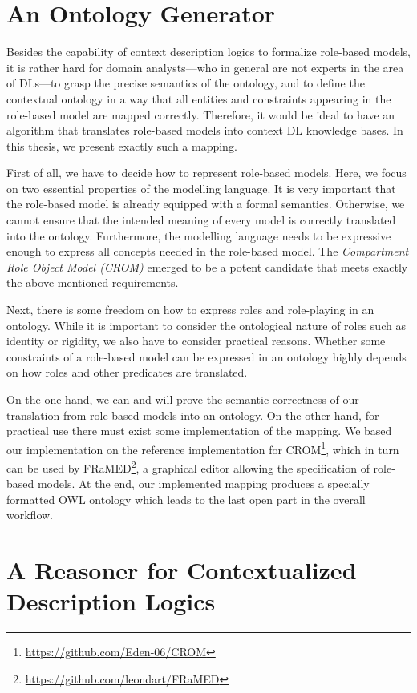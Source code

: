 \section{An Ontology Generator}
\label{sec:zweite-section}

Besides the capability of context description logics to formalize role-based models, it is rather
hard for domain analysts---who in general are not experts in the area of DLs---to grasp the precise
semantics of the ontology, and to define the contextual ontology in a way that all entities and
constraints appearing in the role-based model are mapped correctly. Therefore, it would be ideal to
have an algorithm that translates role-based models into context DL knowledge bases.  In this thesis, we
present exactly such a mapping.

First of all, we have to decide how to represent role-based models. Here, we focus on two essential
properties of the modelling language. It is very important that the role-based model is already
equipped with a formal semantics. Otherwise, we cannot ensure that the intended meaning of every
model is correctly translated into the ontology. Furthermore, the modelling language needs to be
expressive enough to express all concepts needed in the role-based model.
%
The \emph{Compartment Role Object Model (CROM)}\cite{KuLG-SLE14,KBG-SLE15} emerged to be a potent
candidate that meets exactly the above mentioned requirements.

Next, there is some freedom on how to express roles and role-playing in an ontology. While it is
important to consider the ontological nature of roles such as identity or rigidity, we also have to
consider practical reasons. Whether some constraints of a role-based model can be expressed in an ontology
highly depends on how roles and other predicates are translated.

On the one hand, we can and will prove the semantic correctness of our translation from role-based
models into an \LMLO ontology. On the other hand, for practical use there must exist some
implementation of the mapping. We based our implementation on the reference implementation for
CROM\footnote{\url{https://github.com/Eden-06/CROM}}, which in turn can be used by
FRaMED\footnote{\url{https://github.com/leondart/FRaMED}}, a graphical editor allowing the
specification of role-based models. At the end, our implemented mapping produces a specially
formatted OWL ontology which leads to the last open part in the overall workflow.

\section{A Reasoner for Contextualized Description Logics}
\label{sec:intro-reasoner}

